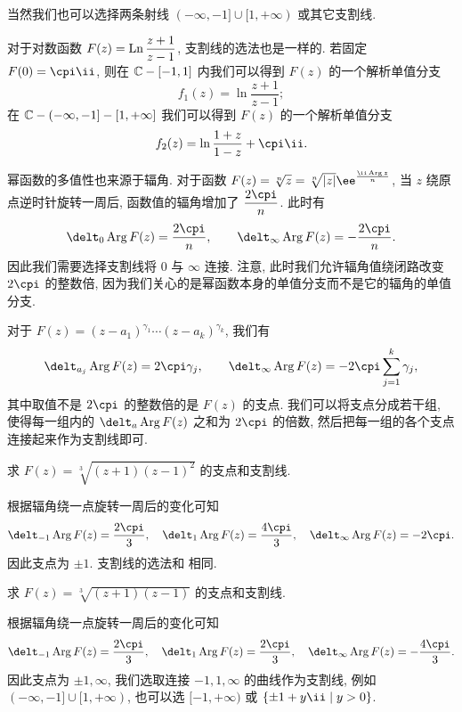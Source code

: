 当然我们也可以选择两条射线 $(-\infty,-1]\cup[1,+\infty)$ 或其它支割线.

对于对数函数 $F(z)=\operatorname{Ln}\dfrac{z+1}{z-1}$, 支割线的选法也是一样的.
若固定 $F(0)=\cpi\ii$, 则在 ${\mathbb{C}}-[-1,1]$ 内我们可以得到 $F(z)$ 的一个解析单值分支
\[
  f_1(z)=\ln\frac{z+1}{z-1};
\]
在 ${\mathbb{C}}-(-\infty,-1]-[1,+\infty]$ 我们可以得到 $F(z)$ 的一个解析单值分支
\[
  f_2(z)=\ln\frac{1+z}{1-z}+\cpi\ii.
\]

幂函数的多值性也来源于辐角.
对于函数 $F(z)=\sqrt[n]{z}=\sqrt[n]{|z|}\ee^{\frac{\ii\Arg z}n}$, 当 $z$ 绕原点逆时针旋转一周后, 函数值的辐角增加了 $\dfrac{2\cpi}n$.
此时有
\[
  \delt_0 \Arg F(z)=\frac{2\cpi}n,\qquad
  \delt_\infty \Arg F(z)=-\frac{2\cpi}n.
\]
因此我们需要选择支割线将 $0$ 与 $\infty$ 连接.
注意, 此时我们允许辐角值绕闭路改变 $2\cpi$ 的整数倍, 因为我们关心的是幂函数本身的单值分支而不是它的辐角的单值分支.

对于 $F(z)=(z-a_1)^{\gamma_1}\cdots(z-a_k)^{\gamma_k}$, 我们有
\[
  \delt_{a_j}\Arg F(z)=2\cpi\gamma_j,\qquad
  \delt_\infty \Arg F(z)=-2\cpi\sum_{j=1}^k\gamma_j,
\]
其中取值不是 $2\cpi$ 的整数倍的是 $F(z)$ 的支点.
我们可以将支点分成若干组, 使得每一组内的 $\delt_a\Arg F(z)$ 之和为 $2\cpi$ 的倍数, 然后把每一组的各个支点连接起来作为支割线即可.

\begin{example}
  求 $F(z)=\sqrt[3]{(z+1)(z-1)^2}$ 的支点和支割线.
\end{example}

\begin{solution}
  根据辐角绕一点旋转一周后的变化可知
  \[
    \delt_{-1} \Arg F(z)=\frac{2\cpi}3,\quad
    \delt_1 \Arg F(z)=\frac{4\cpi}3,\quad
    \delt_\infty \Arg F(z)=-2\cpi.
  \]
  因此支点为 $\pm1$.
  支割线的选法和 相同.
\end{solution}

\begin{example}
  求 $F(z)=\sqrt[3]{(z+1)(z-1)}$ 的支点和支割线.
\end{example}

\begin{solution}
  根据辐角绕一点旋转一周后的变化可知
  \[
    \delt_{-1} \Arg F(z)=\frac{2\cpi}3,\quad
    \delt_1 \Arg F(z)=\frac{2\cpi}3,\quad
    \delt_\infty \Arg F(z)=-\frac{4\cpi}3.
  \]
  因此支点为 $\pm1,\infty$, 我们选取连接 $-1,1,\infty$ 的曲线作为支割线, 例如 $(-\infty,-1]\cup[1,+\infty)$, 也可以选 $[-1,+\infty)$ 或 $\set{\pm1+y\ii\mid y>0}$.
\end{solution}

